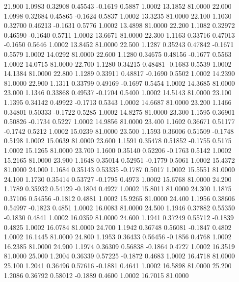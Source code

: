   21.900   1.0983   0.32908   0.45543  -0.1619   0.5887   1.0002  13.1852  81.0000
  22.000   1.0998   0.32684   0.45865  -0.1624   0.5837   1.0002  13.3235  81.0000
  22.100   1.1030   0.32700   0.46213  -0.1631   0.5776   1.0002  13.4898  81.0000
  22.200   1.1082   0.32972   0.46590  -0.1640   0.5711   1.0002  13.6671  81.0000
  22.300   1.1163   0.33716   0.47013  -0.1650   0.5646   1.0002  13.8452  81.0000
  22.500   1.1287   0.35243   0.47842  -0.1671   0.5579   1.0002  14.0292  81.0000
  22.600   1.1280   0.34675   0.48156  -0.1677   0.5563   1.0002  14.0715  81.0000
  22.700   1.1280   0.34215   0.48481  -0.1683   0.5539   1.0002  14.1384  81.0000
  22.800   1.1289   0.33911   0.48817  -0.1690   0.5502   1.0002  14.2390  81.0000
  22.900   1.1311   0.33799   0.49169  -0.1697   0.5454   1.0002  14.3685  81.0000
  23.000   1.1346   0.33868   0.49537  -0.1704   0.5400   1.0002  14.5143  81.0000
  23.100   1.1395   0.34142   0.49922  -0.1713   0.5343   1.0002  14.6687  81.0000
  23.200   1.1466   0.34801   0.50333  -0.1722   0.5285   1.0002  14.8275  81.0000
  23.300   1.1595   0.36901   0.50826  -0.1734   0.5227   1.0002  14.9856  81.0000
  23.400   1.1602   0.36671   0.51177  -0.1742   0.5212   1.0002  15.0239  81.0000
  23.500   1.1593   0.36006   0.51509  -0.1748   0.5198   1.0002  15.0639  81.0000
  23.600   1.1591   0.35478   0.51852  -0.1755   0.5175   1.0002  15.1265  81.0000
  23.700   1.1600   0.35140   0.52206  -0.1763   0.5142   1.0002  15.2165  81.0000
  23.900   1.1648   0.35014   0.52951  -0.1779   0.5061   1.0002  15.4372  81.0000
  24.000   1.1684   0.35143   0.53335  -0.1787   0.5017   1.0002  15.5551  81.0000
  24.100   1.1730   0.35414   0.53727  -0.1795   0.4973   1.0002  15.6768  81.0000
  24.200   1.1789   0.35932   0.54129  -0.1804   0.4927   1.0002  15.8011  81.0000
  24.300   1.1875   0.37106   0.54556  -0.1812   0.4881   1.0002  15.9265  81.0000
  24.400   1.1956   0.38606   0.54997  -0.1823   0.4851   1.0002  16.0083  81.0000
  24.500   1.1946   0.37882   0.55350  -0.1830   0.4841   1.0002  16.0359  81.0000
  24.600   1.1941   0.37249   0.55712  -0.1839   0.4825   1.0002  16.0784  81.0000
  24.700   1.1942   0.36748   0.56081  -0.1847   0.4802   1.0002  16.1445  81.0000
  24.800   1.1953   0.36433   0.56456  -0.1856   0.4768   1.0002  16.2385  81.0000
  24.900   1.1974   0.36309   0.56838  -0.1864   0.4727   1.0002  16.3519  81.0000
  25.000   1.2004   0.36339   0.57225  -0.1872   0.4683   1.0002  16.4718  81.0000
  25.100   1.2041   0.36496   0.57616  -0.1881   0.4641   1.0002  16.5898  81.0000
  25.200   1.2086   0.36792   0.58012  -0.1889   0.4600   1.0002  16.7015  81.0000
